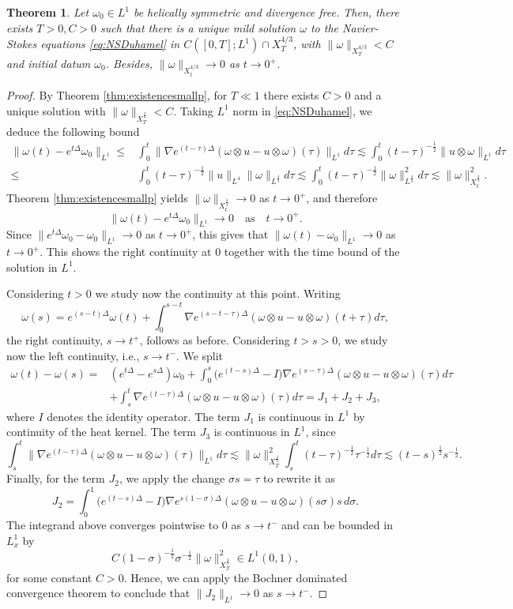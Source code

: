 \documentclass[11pt,a4paper]{article}
\newcommand{\w}{\omega}
\newcommand{\na}{\nabla}
\def\heat#1{e^{#1 \Delta}}
\newtheorem{thm}{Theorem}[section]
\begin{document}
\begin{thm}\label{thm:shorttimeWP}
Let $\w_0\in L^1$ be helically symmetric and divergence free. Then, there exists $T>0, C>0$ such that there is a unique mild solution $\omega$ to the Navier-Stokes equations \eqref{eq:NSDuhamel} in $C([0,T];L^1)\cap X^{4/3}_T $, with $\|\w\|_{X^{4/3}_T}<C$ and initial datum $\w_0$. Besides, $\|\w\|_{X^{4/3}_t}\to 0$ as $t\to 0^+$.
\end{thm}
\begin{proof}
By Theorem \ref{thm:existencesmallp}, for $T\ll 1$ there exists $C>0$ and a unique solution with $\|\w\|_{X^{\frac{4}{3}}_T}<C.$ Taking $L^1$ norm in \eqref{eq:NSDuhamel}, we deduce  the following bound
\begin{align*}
\|\w(t)-\heat{t}\w_0\|_{L^1}\leq &\int_0^t\|\na\heat{(t-\tau)}(\w\otimes u-u\otimes \w)(\tau)\|_{L^1}d\tau\lesssim \int_0^t (t-\tau)^{-\frac{1}{2}}\|u\otimes \w\|_{L^1}d\tau \\ 
\leq& \int_0^t (t-\tau)^{-\frac{1}{2}}\|u\|_{L^4}\|\w\|_{L^\frac{4}{3}}d\tau
\lesssim \int_0^t (t-\tau)^{-\frac{1}{2}}\|\w\|^2_{L^\frac{4}{3}}d\tau
\lesssim \|\w\|_{X_t^\frac{4}{3}}^2.
\end{align*}
Theorem \ref{thm:existencesmallp} yields $\|\w\|_{X_t^\frac{4}{3}}\to 0$ as $t\to 0^+$, and therefore
$$\|\w(t)-\heat{t}\w_0\|_{L^1}\to 0\quad \text{as}\quad t\to 0^+.$$
Since $\|\heat{t}\w_0- \w_0\|_{L^1}\to 0$ as $t\to 0^+$, this gives that $\|\w(t)- \w_0\|_{L^1}\to 0$ as $t\to 0^+$. This shows the right continuity at 0 together with the time bound of the solution in $L^1$. 

Considering $t>0$ we study now the continuity at this point. Writing
$$
\w(s)=\heat{(s-t)}\w(t)+\int_0^{s-t}\na\heat{(s-t-\tau)}(\w\otimes u-u\otimes \w)(t+\tau)d\tau,
$$
the right continuity, $s\to t^+$, follows as before.
Considering $t>s>0$, we study now the left continuity, i.e., $s\to t^-$. We split
$$
\begin{aligned}
\w(t)-\w(s)=&(e^{t\Delta}-e^{s\Delta})\w_0+\int_0^s \big(e^{(t-s)\Delta}-I\big)\na\heat{(s-\tau)}(\w\otimes u-u\otimes \w)(\tau) d\tau \\
&+\int_s^t \na\heat{(t-\tau)}(\w\otimes u-u\otimes \w)(\tau) d\tau=J_1+J_2+J_3,
\end{aligned}$$
where $I$ denotes the identity operator. The term $J_1$ is continuous in $L^1$ by continuity of the heat kernel. The term $J_3$ is continuous in $L^1$, since
$$\int_s^t \|\na\heat{(t-\tau)}(\w\otimes u-u\otimes \w)(\tau)\|_{L^1} d\tau\lesssim \|\w\|_{X_T^\frac{4}{3}}^2\int_s^t(t-\tau)^{-\frac{1}{2}}\tau^{-\frac{1}{2}}d\tau\lesssim (t-s)^\frac{1}{2}s^{-\frac{1}{2}}.$$
Finally, for the term $J_2$, we apply the change $\sigma s=\tau$ to rewrite it as
$$J_2=\int_0^1 \big(e^{(t-s)\Delta}-I\big)\na\heat{s(1-\sigma)}(\w\otimes u-u\otimes \w)(s\sigma)s\,d\sigma.$$
The integrand above converges pointwise to $0$ as $s\to t^-$ and can be bounded in $L_x^1$ by
$$C(1-\sigma)^{-\frac{1}{2}}\sigma^{-\frac{1}{2}}\|\omega\|^2_{X_T^\frac{4}{3}}\in L^1(0,1),$$
for some constant $C>0$.
Hence, we can apply the Bochner dominated convergence theorem to conclude that $\|J_2\|_{L^1}\to 0$ as $s\to t^-.$
\end{proof}
\end{document}
